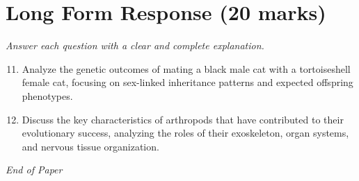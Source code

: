 \documentclass[12pt]{article}
\begin{document}
\section*{Long Form Response (20 marks)}
\textit{Answer each question with a clear and complete explanation.}
\begin{enumerate}[label=\arabic*.]
\setcounter{enumi}{10}
\item Analyze the genetic outcomes of mating a black male cat with a tortoiseshell female cat, focusing on sex-linked inheritance patterns and expected offspring phenotypes.
\item Discuss the key characteristics of arthropods that have contributed to their evolutionary success, analyzing the roles of their exoskeleton, organ systems, and nervous tissue organization.
\end{enumerate}

\vfill
\noindent\textit{End of Paper}
\end{document}
